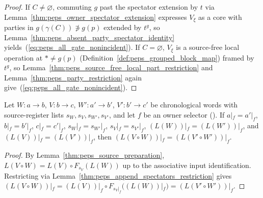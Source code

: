 \begin{proof}\leanok
    If $C\ne\varnothing$, commuting $g$ past the spectator extension by $t$ via
    Lemma~\ref{thm:peps_owner_spectator_extension} expresses $V_\xi$ as a core
    with parties in $g(\gamma(C))\not\ni g(p)$ extended by $t^g$, so
    Lemma~\ref{thm:peps_absent_party_spectator_identity} yields~(\ref{eq:peps_all_gate_nonincident}).
    If $C=\varnothing$, $V_\xi$ is a source-free local operation at $*\ne g(p)$
    (Definition~\ref{def:peps_grouped_block_map}) framed by $t^g$, so
    Lemma~\ref{thm:peps_source_free_local_part_restriction} and
    Lemma~\ref{thm:peps_party_restriction} again give~(\ref{eq:peps_all_gate_nonincident}).
\end{proof}


\begin{lemma}
    \label{thm:peps_selected_local_part_composition}
    \leanok
    Let $W:a\to b$, $V:b\to c$, $W':a'\to b'$, $V':b'\to c'$ be chronological
    words with source-register lists $s_W,s_V,s_{W'},s_{V'}$, and let $f$ be an
    owner selector (\cite[proof of Theorem~5.2]{OpenAI2026PolynomialPEPS}). If
    $a|_f=a'|_f$, $b|_f=b'|_f$, $c|_f=c'|_f$, $s_W|_f=s_{W'}|_f$,
    $s_V|_f=s_{V'}|_f$, $(L(W))|_f=(L(W'))|_f$, and $(L(V))|_f=(L(V'))|_f$,
    then $(L(V\circ W))|_f=(L(V'\circ W'))|_f$.
\end{lemma}

\begin{proof}\leanok
    By Lemma~\ref{thm:peps_source_preparation}, $L(V\circ W)=L(V)\circ F_{s_V}(L(W))$
    up to the associative input identification. Restricting via
    Lemma~\ref{thm:peps_append_spectators_restriction} gives
    $(L(V\circ W))|_f=(L(V))|_f\circ F_{s_V|_f}((L(W))|_f)=(L(V'\circ W'))|_f$.
\end{proof}



